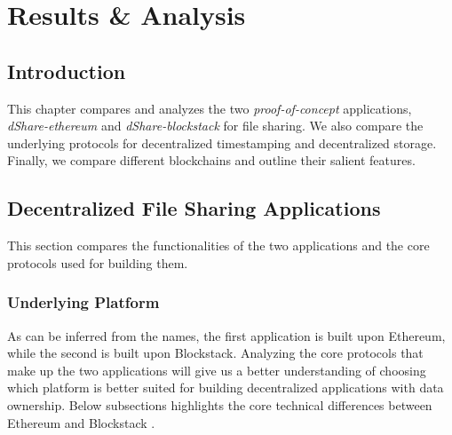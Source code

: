 \chapter{Results \& Analysis}\label{chapter::results}
\section{Introduction}
This chapter compares and analyzes the two \textit{proof-of-concept} applications, \textit{dShare-ethereum} and \textit{dShare-blockstack} for file sharing. We also compare the underlying protocols for decentralized timestamping and decentralized storage. Finally, we compare different blockchains and outline their salient features.

\section{Decentralized File Sharing Applications}
This section compares the functionalities of the two applications and the core protocols used for building them.

\subsection{Underlying Platform}
As can be inferred from the names, the first application is built upon Ethereum\cite{buterin2014ethereum}, while the second is built upon Blockstack\cite{ali2016blockstack}. Analyzing the core protocols that make up the two applications will give us a better understanding of choosing which platform is better suited for building decentralized applications with data ownership. Below subsections highlights the core technical differences between Ethereum and Blockstack \cite{forum:blockstack:2}.
		
